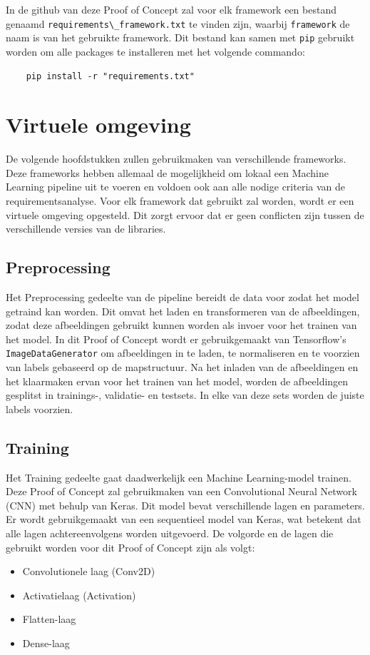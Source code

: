 In de github van deze Proof of Concept zal voor elk framework een bestand genaamd \verb+requirements\_framework.txt+ te vinden zijn, waarbij \verb+framework+ de naam is van het gebruikte framework. Dit bestand kan samen met \verb+pip+ gebruikt worden om alle packages te installeren met het volgende commando:

\begin{verbatim}
    pip install -r "requirements.txt"
\end{verbatim}
\section{Virtuele omgeving}

De volgende hoofdstukken zullen gebruikmaken van verschillende frameworks. Deze frameworks hebben allemaal de mogelijkheid om lokaal een Machine Learning pipeline uit te voeren en voldoen ook aan alle nodige criteria van de requirementsanalyse.
Voor elk framework dat gebruikt zal worden, wordt er een virtuele omgeving opgesteld. Dit zorgt ervoor dat er geen conflicten zijn tussen de verschillende versies van de libraries.

\subsection{Preprocessing}
Het Preprocessing gedeelte van de pipeline bereidt de data voor zodat het model getraind kan worden. Dit omvat het laden en transformeren van de afbeeldingen, zodat deze afbeeldingen gebruikt kunnen worden als invoer voor het trainen van het model. In dit Proof of Concept wordt er gebruikgemaakt van Tensorflow's \verb+ImageDataGenerator+ om afbeeldingen in te laden, te normaliseren en te voorzien van labels gebaseerd op de mapstructuur. Na het inladen van de afbeeldingen en het klaarmaken ervan voor het trainen van het model, worden de afbeeldingen gesplitst in trainings-, validatie- en testsets. In elke van deze sets worden de juiste labels voorzien.
\subsection{Training}
Het Training gedeelte gaat daadwerkelijk een Machine Learning-model trainen. Deze Proof of Concept zal gebruikmaken van een Convolutional Neural Network (CNN) met behulp van Keras. Dit model bevat verschillende lagen en parameters. Er wordt gebruikgemaakt van een sequentieel model van Keras, wat betekent dat alle lagen achtereenvolgens worden uitgevoerd. De volgorde en de lagen die gebruikt worden voor dit Proof of Concept zijn als volgt:
\begin{itemize}
    \item Convolutionele laag (Conv2D)
    \item Activatielaag (Activation)
    \item Flatten-laag
    \item Dense-laag
\end{itemize}
